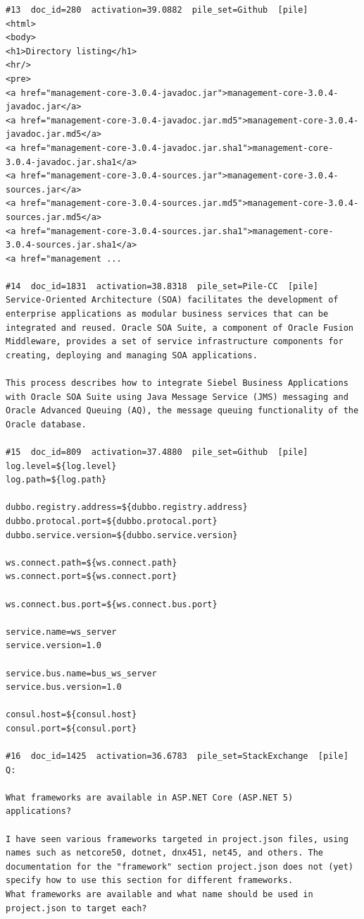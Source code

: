 \begin{verbatim}
#13  doc_id=280  activation=39.0882  pile_set=Github  [pile]
<html>
<body>
<h1>Directory listing</h1>
<hr/>
<pre>
<a href="management-core-3.0.4-javadoc.jar">management-core-3.0.4-javadoc.jar</a>
<a href="management-core-3.0.4-javadoc.jar.md5">management-core-3.0.4-javadoc.jar.md5</a>
<a href="management-core-3.0.4-javadoc.jar.sha1">management-core-3.0.4-javadoc.jar.sha1</a>
<a href="management-core-3.0.4-sources.jar">management-core-3.0.4-sources.jar</a>
<a href="management-core-3.0.4-sources.jar.md5">management-core-3.0.4-sources.jar.md5</a>
<a href="management-core-3.0.4-sources.jar.sha1">management-core-3.0.4-sources.jar.sha1</a>
<a href="management ...

#14  doc_id=1831  activation=38.8318  pile_set=Pile-CC  [pile]
Service-Oriented Architecture (SOA) facilitates the development of enterprise applications as modular business services that can be integrated and reused. Oracle SOA Suite, a component of Oracle Fusion Middleware, provides a set of service infrastructure components for creating, deploying and managing SOA applications.

This process describes how to integrate Siebel Business Applications with Oracle SOA Suite using Java Message Service (JMS) messaging and Oracle Advanced Queuing (AQ), the message queuing functionality of the Oracle database.

#15  doc_id=809  activation=37.4880  pile_set=Github  [pile]
log.level=${log.level}
log.path=${log.path}

dubbo.registry.address=${dubbo.registry.address}
dubbo.protocal.port=${dubbo.protocal.port}
dubbo.service.version=${dubbo.service.version}

ws.connect.path=${ws.connect.path}
ws.connect.port=${ws.connect.port}

ws.connect.bus.port=${ws.connect.bus.port}

service.name=ws_server
service.version=1.0

service.bus.name=bus_ws_server
service.bus.version=1.0

consul.host=${consul.host}
consul.port=${consul.port}

#16  doc_id=1425  activation=36.6783  pile_set=StackExchange  [pile]
Q:

What frameworks are available in ASP.NET Core (ASP.NET 5) applications?

I have seen various frameworks targeted in project.json files, using names such as netcore50, dotnet, dnx451, net45, and others. The documentation for the "framework" section project.json does not (yet) specify how to use this section for different frameworks.
What frameworks are available and what name should be used in project.json to target each?


\end{verbatim}
